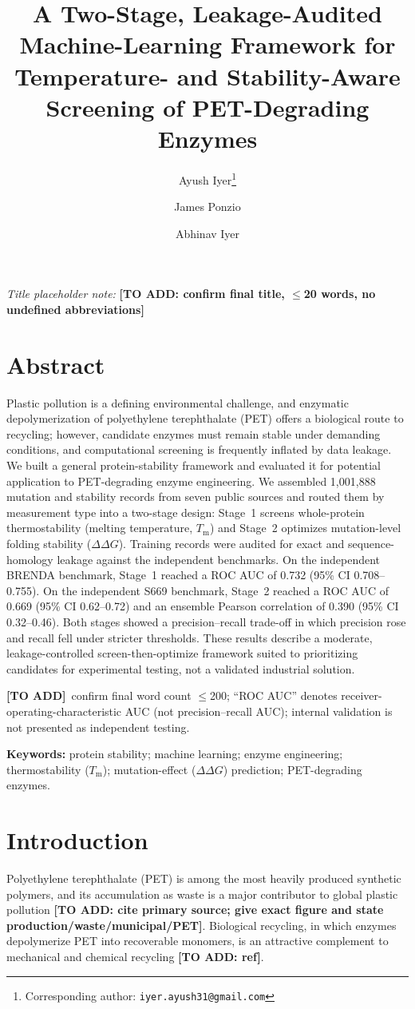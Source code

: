 \documentclass[11pt]{article}
\title{\bfseries A Two-Stage, Leakage-Audited Machine-Learning Framework for
Temperature- and Stability-Aware Screening of PET-Degrading Enzymes}
\author[1]{Ayush Iyer\thanks{Corresponding author: \texttt{iyer.ayush31@gmail.com}}}
\author[2]{James Ponzio}
\author[3]{Abhinav Iyer}
\affil[1]{\filler{affiliation --- institution and country for Ayush Iyer}}
\affil[2]{\filler{affiliation --- institution and country for James Ponzio}}
\affil[3]{\filler{affiliation --- institution and country for Abhinav Iyer}}
\date{}
\newcommand{\filler}[1]{\colorbox{filleryellow}{\bfseries [TO ADD: #1]}}
\newcommand{\fillerblock}[1]{%
  \par\smallskip\noindent
  \colorbox{filleryellow}{\parbox{\dimexpr\linewidth-2\fboxsep\relax}{%
    \small\textbf{[TO ADD]}\ #1}}\par\smallskip}
\newcommand{\ddg}{\ensuremath{\Delta\Delta G}}
\newcommand{\Tm}{\ensuremath{T_\mathrm{m}}}
\begin{document}
\maketitle
\linenumbers

\noindent\textit{Title placeholder note:} \filler{confirm final title, $\leq$20 words, no undefined abbreviations}

\section*{Abstract}
Plastic pollution is a defining environmental challenge, and enzymatic depolymerization of
polyethylene terephthalate (PET) offers a biological route to recycling; however, candidate
enzymes must remain stable under demanding conditions, and computational screening is
frequently inflated by data leakage. We built a general protein-stability framework and
evaluated it for potential application to PET-degrading enzyme engineering. We assembled
1{,}001{,}888 mutation and stability records from seven public sources and routed them by
measurement type into a two-stage design: Stage~1 screens whole-protein thermostability
(melting temperature, \Tm) and Stage~2 optimizes mutation-level folding stability (\ddg).
Training records were audited for exact and sequence-homology leakage against the independent
benchmarks. On the independent BRENDA benchmark, Stage~1 reached a ROC AUC of 0.732 (95\% CI
0.708--0.755). On the independent S669 benchmark, Stage~2 reached a ROC AUC of 0.669 (95\% CI
0.62--0.72) and an ensemble Pearson correlation of 0.390 (95\% CI 0.32--0.46). Both stages
showed a precision--recall trade-off in which precision rose and recall fell under stricter
thresholds. These results describe a moderate, leakage-controlled screen-then-optimize
framework suited to prioritizing candidates for experimental testing, not a validated
industrial solution.
\fillerblock{confirm final word count $\leq$200; ``ROC AUC'' denotes receiver-operating-characteristic AUC (not precision--recall AUC); internal validation is not presented as independent testing.}

\medskip
\noindent\textbf{Keywords:} protein stability; machine learning; enzyme engineering;
thermostability (\Tm); mutation-effect (\ddg) prediction; PET-degrading enzymes.

\section{Introduction}
Polyethylene terephthalate (PET) is among the most heavily produced synthetic polymers, and its
accumulation as waste is a major contributor to global plastic pollution
\filler{cite primary source; give exact figure and state production/waste/municipal/PET}.
Biological recycling, in which enzymes depolymerize PET into recoverable monomers, is an
attractive complement to mechanical and chemical recycling \filler{ref}.
\end{document}
